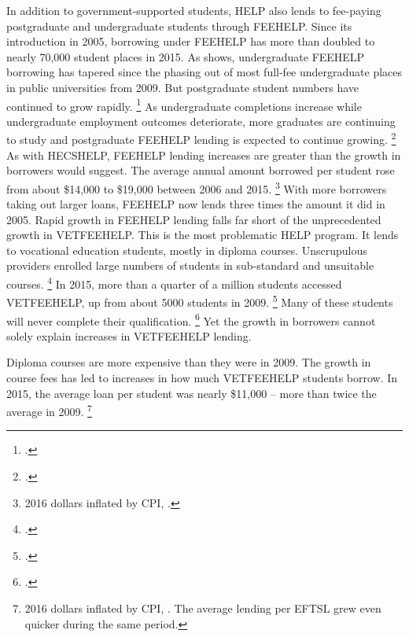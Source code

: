 \documentclass{grattan}
\begin{document}
In addition to government-supported students, \gls{HELP} also lends to fee-paying postgraduate and undergraduate students through \gls{FEEHELP}\@.
Since its introduction in 2005, borrowing under \gls{FEEHELP} has more than doubled to nearly 70,000 student places in 2015.
As  shows, undergraduate \gls{FEEHELP} borrowing has tapered since the phasing out of most full-fee undergraduate places in public universities from 2009.
But postgraduate student numbers have continued to grow rapidly.%
   \footnote{\textcites[][Section~5, Table~5.1]{Education2015StudentsSelectedhigher}{Education2015Highereducationreport}.} As undergraduate completions increase while undergraduate employment outcomes deteriorate, more graduates are continuing to study and postgraduate \gls{FEEHELP} lending is expected to continue growing.%
\footcites{Norton2016MappingAustralianhigher}{Education2016uCubeHighereducation} %
As with \gls{HECSHELP}, \gls{FEEHELP} lending increases are greater than the growth in borrowers would suggest.
The average annual amount borrowed per student rose from about \$14,000 to \$19,000 between 2006 and 2015.%
   \footnote{2016 dollars inflated by \gls{CPI}, \textcite{ABS2016ConsumerPriceIndex}.} With more borrowers taking out larger loans, \gls{FEEHELP} now lends three times the amount it did in 2005. Rapid growth in \gls{FEEHELP} lending falls far short of the unprecedented growth in \gls{VETFEEHELP}\@.
This is the most problematic \gls{HELP} program.
It lends to vocational education students, mostly in diploma courses.
Unscrupulous providers enrolled large numbers of students in sub-standard and unsuitable courses.%
   \footnote{\textcite{Education2015Gettingourmoneys}.} In 2015, more than a quarter of a million students accessed \gls{VETFEEHELP}, up from about 5000 students in 2009.%
   \footnote{\textcite[][14]{Ryan2016RedesigningVETFEE}.} Many of these students will never complete their qualification.%
   \footnote{\textcite{NCVER2015preliminaryanalysisoutcomes}.} Yet the growth in borrowers cannot solely explain increases in \gls{VETFEEHELP} lending.

Diploma courses are more expensive than they were in 2009.
The growth in course fees has led to increases in how much \gls{VETFEEHELP} students borrow.
In 2015, the average loan per student was nearly \$11,000 -- more than twice the average in 2009.%
   \footnote{2016 dollars inflated by \gls{CPI}, \textcite[][17]{Ryan2016RedesigningVETFEE}.
The average lending per \gls{EFTSL} grew even quicker during the same period.}
\end{document}
